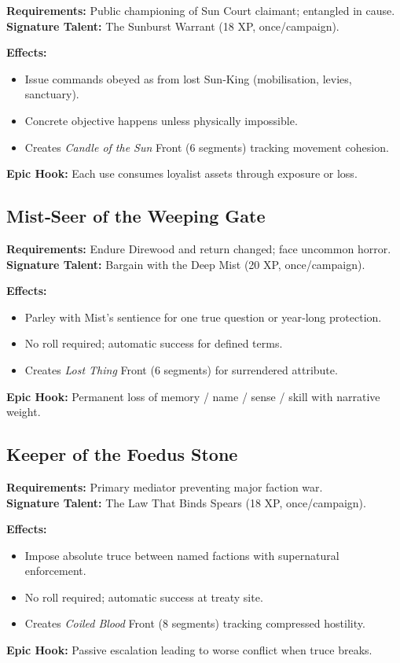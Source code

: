 \textbf{Requirements:} Public championing of Sun Court claimant; entangled in cause.\\
\textbf{Signature Talent:} The Sunburst Warrant (18 XP, once/campaign).

\textbf{Effects:}
\begin{itemize}
    \item Issue commands obeyed as from lost Sun‑King (mobilisation, levies, sanctuary).
    \item Concrete objective happens unless physically impossible.
    \item Creates \emph{Candle of the Sun} Front (6 segments) tracking movement cohesion.
\end{itemize}
\textbf{Epic Hook:} Each use consumes loyalist assets through exposure or loss.

\subsection{Mist‑Seer of the Weeping Gate}\label{subsec:mist_seer}

\textbf{Requirements:} Endure Direwood and return changed; face uncommon horror.\\
\textbf{Signature Talent:} Bargain with the Deep Mist (20 XP, once/campaign).

\textbf{Effects:}
\begin{itemize}
    \item Parley with Mist's sentience for one true question or year‑long protection.
    \item No roll required; automatic success for defined terms.
    \item Creates \emph{Lost Thing} Front (6 segments) for surrendered attribute.
\end{itemize}
\textbf{Epic Hook:} Permanent loss of memory / name / sense / skill with narrative weight.

\subsection{Keeper of the Foedus Stone}\label{subsec:foedus_keeper}

\textbf{Requirements:} Primary mediator preventing major faction war.\\
\textbf{Signature Talent:} The Law That Binds Spears (18 XP, once/campaign).

\textbf{Effects:}
\begin{itemize}
    \item Impose absolute truce between named factions with supernatural enforcement.
    \item No roll required; automatic success at treaty site.
    \item Creates \emph{Coiled Blood} Front (8 segments) tracking compressed hostility.
\end{itemize}
\textbf{Epic Hook:} Passive escalation leading to worse conflict when truce breaks.

